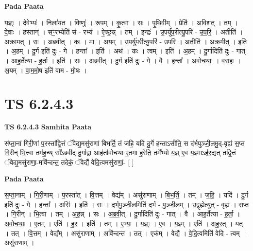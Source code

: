 \documentclass[17pt]{extarticle}
\begin{document}
\textbf{Pada Paata} \newline

य॒ज्ञ्ः । दे॒वेभ्यः॑ । निला॑यत । विष्णुः॑ । रू॒पम् । कृ॒त्वा । सः । पृ॒थि॒वीम् । प्रेति॑ । अ॒वि॒श॒त् । तम् । दे॒वाः । हस्तान्॑ । सꣳ॒॒रभ्येति॑ सं - रभ्य॑ । ऐ॒च्छ॒न्न् । तम् । इन्द्रः॑ । उ॒पर्यु॑प॒रीत्यु॒परि॑ - उ॒प॒रि॒ । अतीति॑ । अ॒क्रा॒म॒त् । सः । अ॒ब्र॒वी॒त् । कः । मा॒ । अ॒यम् । उ॒पर्यु॑प॒रीत्यु॒परि॑ - उ॒प॒रि॒ । अतीति॑ । अ॒क्र॒मी॒त् । इति॑ । अ॒हम् । दु॒र्ग इति॑ दुः - गे । हन्ता᳚ । इति॑ । अथ॑ । कः । त्वम् । इति॑ । अ॒हम् । दु॒र्गादिति॑ दुः - गात् । आह॒र्तेत्या - ह॒र्ता॒ । इति॑ । सः । अ॒ब्र॒वी॒त् । दु॒र्ग इति॑ दुः - गे । वै । हन्ता᳚ । अ॒वो॒च॒थाः॒ । व॒रा॒हः । अ॒यम् । वा॒म॒मो॒ष इति॑ वाम - मो॒षः ।  \newline




\section*{ TS 6.2.4.3 }

\textbf{TS 6.2.4.3 } \newline
\textbf{Samhita Paata} \newline

स॑प्ता॒नां गि॑री॒णां प॒रस्ता᳚द्वि॒त्तं ॅवेद्य॒मसु॑राणां बिभर्ति॒ तं ज॑हि॒ यदि॑ दु॒र्गे हन्ताऽसीति॒ स द॑र्भपुञ्जी॒लमु॒द्-वृह्य॑ स॒प्त गि॒रीन् भि॒त्त्वा तम॑ह॒न्थ् सो᳚ऽब्रवीद् दु॒र्गाद्वा आह॑र्तावोचथा ए॒तमा ह॒रेति॒ तमे᳚भ्यो य॒ज्ञ् ए॒व य॒ज्ञ्माऽह॑र॒द्यत् तद्वि॒त्तं ॅवेद्य॒मसु॑राणा॒-मवि॑न्दन्त॒ तदेकं॒ ॅवेद्यै॑ वेदि॒त्वमसु॑राणां॒- [  ] \newline

\textbf{Pada Paata} \newline

स॒प्ता॒नाम् । गि॒री॒णाम् । प॒रस्ता᳚त् । वि॒त्तम् । वेद्य᳚म् । असु॑राणाम् । बि॒भ॒र्ति॒ । तम् । ज॒हि॒ । यदि॑ । दु॒र्ग इति॑ दुः - गे । हन्ता᳚ । असि॑ । इति॑ । सः । द॒र्भ॒पु॒ञ्जी॒लमिति॑ दर्भ - पु॒ञ्जी॒लम् । उ॒द्वृह्येत्यु॑त् - वृह्य॑ । स॒प्त । गि॒रीन् । भि॒त्वा । तम् । अ॒ह॒न्न् । सः । अ॒ब्र॒वी॒त् । दु॒र्गादिति॑ दुः - गात् । वै । आह॒र्तेत्या - ह॒र्ता॒ । अ॒वो॒च॒थाः॒ । ए॒तम् । एति॑ । ह॒र॒ । इति॑ । तम् । ए॒भ्यः॒ । य॒ज्ञ्ः । ए॒व । य॒ज्ञ्म् । एति॑ । अ॒ह॒र॒त् । यत् । तत् । वि॒त्तम् । वेद्य᳚म् । असु॑राणाम् । अवि॑न्दन्त । तत् । एक᳚म् । वेद्यै᳚ । वे॒दि॒त्वमिति॑ वेदि - त्वम् । असु॑राणाम् ।  \newline
\end{document}

